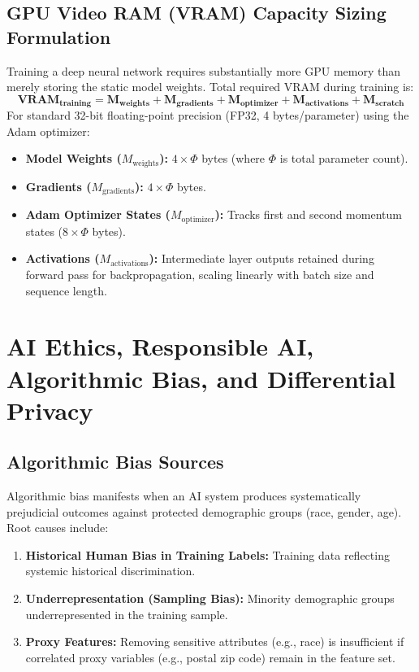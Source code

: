 \subsection{GPU Video RAM (VRAM) Capacity Sizing Formulation}
Training a deep neural network requires substantially more GPU memory than merely storing the static model weights. Total required VRAM during training is:
\begin{equation}
\label{eq:vram_sizing}
\mathbf{\text{VRAM}_{\text{training}} = M_{\text{weights}} + M_{\text{gradients}} + M_{\text{optimizer}} + M_{\text{activations}} + M_{\text{scratch}}}
\end{equation}
For standard 32-bit floating-point precision (FP32, 4 bytes/parameter) using the Adam optimizer:
\begin{itemize}
    \item \textbf{Model Weights ($M_{\text{weights}}$):} $4 \times \Phi$ bytes (where $\Phi$ is total parameter count).
    \item \textbf{Gradients ($M_{\text{gradients}}$):} $4 \times \Phi$ bytes.
    \item \textbf{Adam Optimizer States ($M_{\text{optimizer}}$):} Tracks first and second momentum states ($8 \times \Phi$ bytes).
    \item \textbf{Activations ($M_{\text{activations}}$):} Intermediate layer outputs retained during forward pass for backpropagation, scaling linearly with batch size and sequence length.
\end{itemize}


\section{AI Ethics, Responsible AI, Algorithmic Bias, and Differential Privacy}
\label{sec:ai_ethics_privacy}

\subsection{Algorithmic Bias Sources}
Algorithmic bias manifests when an AI system produces systematically prejudicial outcomes against protected demographic groups (race, gender, age). Root causes include:
\begin{enumerate}
    \item \textbf{Historical Human Bias in Training Labels:} Training data reflecting systemic historical discrimination.
    \item \textbf{Underrepresentation (Sampling Bias):} Minority demographic groups underrepresented in the training sample.
    \item \textbf{Proxy Features:} Removing sensitive attributes (e.g., race) is insufficient if correlated proxy variables (e.g., postal zip code) remain in the feature set.
\end{enumerate}

